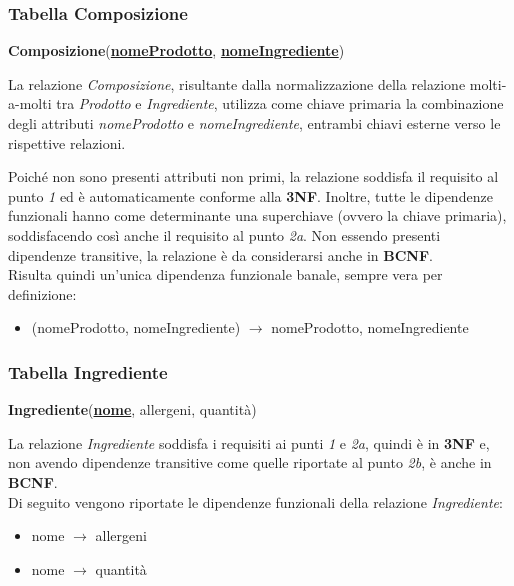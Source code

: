 \documentclass[12pt,a4paper]{article}
\begin{document}
    \subsubsection*{Tabella Composizione}
    \begin{tcolorbox}[
        colback=gray!8,
        colframe=black!30,
        title=
    ]
        \textbf{Composizione}(\textbf{\uline{nomeProdotto}}, \textbf{\uline{nomeIngrediente}})
    \end{tcolorbox}
    
    \noindent
    La relazione \textit{Composizione}, risultante dalla normalizzazione della relazione molti-a-molti tra \textit{Prodotto} e \textit{Ingrediente}, utilizza come chiave primaria la combinazione degli attributi \textit{nomeProdotto} e \textit{nomeIngrediente}, entrambi chiavi esterne verso le rispettive relazioni.
    
    \vspace{8pt}
    \noindent
    Poiché non sono presenti attributi non primi, la relazione soddisfa il requisito al punto \textit{1} ed è automaticamente conforme alla \textbf{3NF}. Inoltre, tutte le dipendenze funzionali hanno come determinante una superchiave (ovvero la chiave primaria), soddisfacendo così anche il requisito al punto \textit{2a}. Non essendo presenti dipendenze transitive, la relazione è da considerarsi anche in \textbf{BCNF}.\\
    Risulta quindi un'unica dipendenza funzionale banale, sempre vera per definizione:
    \begin{itemize}[leftmargin=1em, label=$\circ$]
        \item (nomeProdotto, nomeIngrediente) $\rightarrow$ nomeProdotto, nomeIngrediente
    \end{itemize}


    \subsubsection*{Tabella Ingrediente}
    \begin{tcolorbox}[
        colback=gray!8,
        colframe=black!30,
        title=
    ]
        \textbf{Ingrediente}(\textbf{\uline{nome}}, allergeni, quantità)
    \end{tcolorbox}
    
    \noindent
    La relazione \textit{Ingrediente} soddisfa i requisiti ai punti \textit{1} e \textit{2a}, quindi è in \textbf{3NF} e, non avendo dipendenze transitive come quelle riportate al punto \textit{2b}, è anche in \textbf{BCNF}.\\
    Di seguito vengono riportate le dipendenze funzionali della relazione \textit{Ingrediente}:
    \begin{itemize}[leftmargin=1em, label=$\circ$]
        \item nome $\rightarrow$ allergeni
        \item nome $\rightarrow$ quantità
    \end{itemize}
\end{document}
